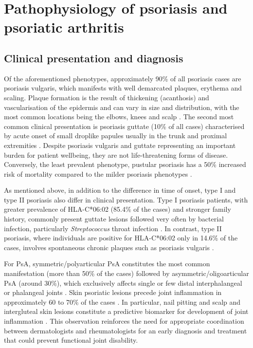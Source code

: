 \section{Pathophysiology of psoriasis and psoriatic arthritis}

\subsection{Clinical presentation and diagnosis}
%
Of the aforementioned phenotypes, approximately 90\% of all psoriasis cases are psoriasis vulgaris, which manifests with well demarcated plaques, erythema and scaling. Plaque formation is the result of thickening (acanthosis) and vascularisation of the epidermis and can vary in size and distribution, with the most common locations being the elbows, knees and scalp \parencite{ Perera2012,Griffiths2007}. The second most common clinical presentation is psoriasis guttate (10\% of all cases) characterised by acute onset of small droplike papules usually in the trunk and proximal extremities \parencite{Vence2015}. Despite psoriasis vulgaris and guttate representing an important burden for patient wellbeing, they are not life-threatening forms of disease. Conversely, the least prevalent phenotype, pustular psoriasis has a 50\% increased risk of mortality compared to the milder psoriasis phenotypes \parencite{Gelfand2007,Moura2015}.  

As mentioned above, in addition to the difference in time of onset, type I and type II psoriasis also differ in clinical presentation. Type I psoriasis patients, with greater prevalence of HLA-C*06:02 (85.4\% of the cases) and stronger family history, commonly present guttate lesions followed very often by bacterial infection, particularly \textit{Streptococcus} throat infection \parencite{}. In contrast, type II psoriasis, where individuals are positive for HLA-C*06:02 only in 14.6\% of the cases, involves spontaneous chronic plaques such as psoriasis vulgaris \parencite{Perera2012}. 


For PsA, symmetric/polyarticular PsA constitutes the most common manifestation (more than 50\% of the cases) followed by asymmetric/oligoarticular PsA (around 30\%), which exclusively affects single or few distal interphalangeal or phalangeal joints \parencite{Reich2009, McGonagle2011}. Skin psoriatic lesions precede joint inflammation in approximately 60 to 70\% of the cases \parencite{Gladman2005, McGonagle2011}. In particular, nail pitting and scalp and intergluteal skin lesions constitute a predictive biomarker for development of joint inflammation \parencite{Moll1976,Griffiths2007,McGonagle,2011}. This observation reinforces the need for appropriate coordination between dermatologists and rheumatologists for an early diagnosis and treatment that could prevent functional joint disability.

